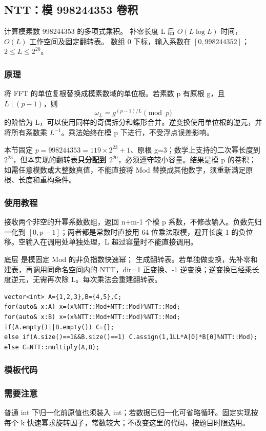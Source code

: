 \subsection{NTT：模 998244353 卷积}
\label{math:ntt}
\AlgorithmInfo
    {计算模素数 998244353 的多项式乘积。}
    {补零长度 L 后 $O(L\log L)$ 时间，$O(L)$ 工作空间及固定翻转表。}
    {数组 0 下标，输入系数在 $[0,998244352]$；$2\le L\le2^{20}$。}
\subsubsection*{原理}
将 FFT 的单位复根替换成模素数域的单位根。若素数 p 有原根 g，且 $L\mid(p-1)$，则
\[
 \omega_L=g^{(p-1)/L}\pmod p
\]
的阶恰为 L，可以使用同样的奇偶拆分和蝶形合并。逆变换使用单位根的逆元，并将所有系数乘 $L^{-1}$。乘法始终在模 p 下进行，不受浮点误差影响。

本节固定 $p=998244353=119\times2^{23}+1$、原根 g=3；数学上支持的二次幂长度到 $2^{23}$，但本实现的翻转表\textbf{只分配到 $2^{20}$}，必须遵守较小容量。结果是模 p 的卷积；如需任意模数或大整数真值，不能直接将 Mod 替换成其他数字，须重新满足原根、长度和重构条件。
\subsubsection*{使用教程}
 接收两个非空的升幂系数数组，返回 n+m-1 个模 p 系数，不修改输入。负数先归一化到 $[0,p-1]$；两者都是常数时直接用 64 位乘法取模，避开长度 1 的负位移。空输入在调用处单独处理，L 超过容量时不能直接调用。

底层  是模固定 Mod 的非负指数快速幂； 生成翻转表。若单独做变换，先补零和建表，再调用同命名空间内的 NTT，dir=1 正变换、-1 逆变换；逆变换已经乘长度逆元，无需再次除 L。每次乘法会重建翻转表。
\begin{lstlisting}[style=mtycpp,numbers=none]
vector<int> A={1,2,3},B={4,5},C;
for(auto& x:A) x=(x%NTT::Mod+NTT::Mod)%NTT::Mod;
for(auto& x:B) x=(x%NTT::Mod+NTT::Mod)%NTT::Mod;
if(A.empty()||B.empty()) C={};
else if(A.size()==1&&B.size()==1) C.assign(1,1LL*A[0]*B[0]%NTT::Mod);
else C=NTT::multiply(A,B);
\end{lstlisting}
\subsubsection*{模板代码}
\subsubsection*{需要注意}
普通 int 下归一化前原值也须装入 int；若数据已归一化可省略循环。固定实现按每个 k 快速幂求旋转因子，常数较大；不改变这里的代码，按题目时限选用。
